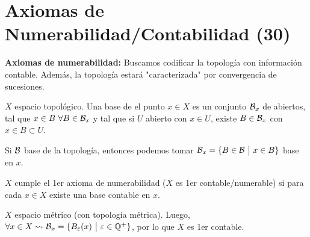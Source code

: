 
\section{Axiomas de Numerabilidad/Contabilidad (30)}

\textbf{Axiomas de numerabilidad:} Buscamos codificar la topología con información contable. Además, la topología estará "caracterizada" por convergencia de sucesiones.

\begin{definition}
	$X$ espacio topológico. Una base de el punto $x \in X$ es un conjunto $\mathcal{B}_{x}$ de abiertos, tal que $x \in B \ \forall B \in \mathcal{B}_{x}$ y tal que si $U$ abierto con $x \in U$, existe $B \in \mathcal{B}_{x}$ con $x \in B \subset U$.
\end{definition}

\begin{eg}
	Si $\mathcal{B}$ base de la topología, entonces podemos tomar $\mathcal{B}_{x} = \{B \in \mathcal{B} \ \big| \ x \in B\}$ base en $x$.
\end{eg}

\begin{definition}
	$X$ cumple el 1er axioma de numerabilidad ($X$ es 1er contable/numerable) si para cada $x \in X$ existe una base contable en $x$.
\end{definition}

\begin{eg}
	$X$ espacio métrico (con topología métrica). Luego, $\forall x \in X \leadsto \mathcal{B}_{x} = \{B_{\varepsilon}(x) \ \big| \ \varepsilon \in \mathbb{Q}^{+}\}$, por lo que $X$ es 1er contable.
\end{eg}

